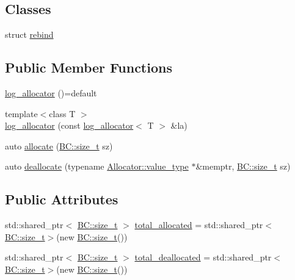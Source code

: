 \subsection*{Classes}
\begin{DoxyCompactItemize}
\item 
struct \hyperlink{structBC_1_1tests_1_1log__allocator_1_1rebind}{rebind}
\end{DoxyCompactItemize}
\subsection*{Public Member Functions}
\begin{DoxyCompactItemize}
\item 
\hyperlink{structBC_1_1tests_1_1log__allocator_a696c2f544e5b6b4296a82ce6d2e02f47}{log\+\_\+allocator} ()=default
\item 
{\footnotesize template$<$class T $>$ }\\\hyperlink{structBC_1_1tests_1_1log__allocator_a8ece15db677dfb81ca0c29be51392db0}{log\+\_\+allocator} (const \hyperlink{structBC_1_1tests_1_1log__allocator}{log\+\_\+allocator}$<$ T $>$ \&la)
\item 
auto \hyperlink{structBC_1_1tests_1_1log__allocator_ac1f6d426cba5e161cd3901fe98b7ddea}{allocate} (\hyperlink{namespaceBC_a6007cbc4eeec401a037b558910a56173}{B\+C\+::size\+\_\+t} sz)
\item 
auto \hyperlink{structBC_1_1tests_1_1log__allocator_a409cb739866e398d3bbecc629cced894}{deallocate} (typename \hyperlink{structBC_1_1allocators_1_1Host_a0663f90f62e2b8c223a4402bef3d87e5}{Allocator\+::value\+\_\+type} $\ast$\&memptr, \hyperlink{namespaceBC_a6007cbc4eeec401a037b558910a56173}{B\+C\+::size\+\_\+t} sz)
\end{DoxyCompactItemize}
\subsection*{Public Attributes}
\begin{DoxyCompactItemize}
\item 
std\+::shared\+\_\+ptr$<$ \hyperlink{namespaceBC_a6007cbc4eeec401a037b558910a56173}{B\+C\+::size\+\_\+t} $>$ \hyperlink{structBC_1_1tests_1_1log__allocator_a683a18471dcf4a5d253862c24d4a05a8}{total\+\_\+allocated} = std\+::shared\+\_\+ptr$<$\hyperlink{namespaceBC_a6007cbc4eeec401a037b558910a56173}{B\+C\+::size\+\_\+t}$>$(new \hyperlink{namespaceBC_a6007cbc4eeec401a037b558910a56173}{B\+C\+::size\+\_\+t}())
\item 
std\+::shared\+\_\+ptr$<$ \hyperlink{namespaceBC_a6007cbc4eeec401a037b558910a56173}{B\+C\+::size\+\_\+t} $>$ \hyperlink{structBC_1_1tests_1_1log__allocator_ac67d73b48ae664682454e6ecc0b0e7fc}{total\+\_\+deallocated} = std\+::shared\+\_\+ptr$<$\hyperlink{namespaceBC_a6007cbc4eeec401a037b558910a56173}{B\+C\+::size\+\_\+t}$>$(new \hyperlink{namespaceBC_a6007cbc4eeec401a037b558910a56173}{B\+C\+::size\+\_\+t}())
\end{DoxyCompactItemize}
